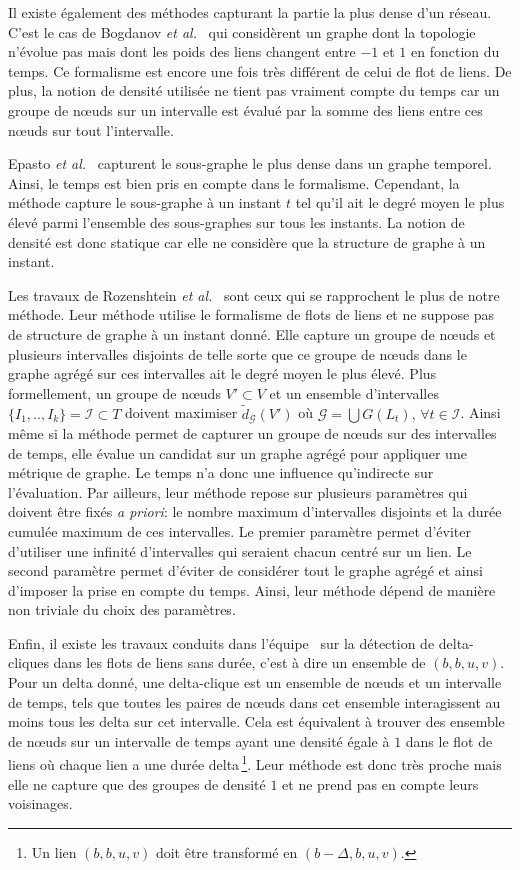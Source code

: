 Il existe également des méthodes capturant la partie la plus dense d'un réseau.
C'est le cas de Bogdanov \emph{et al.}~\cite{Bogdanov2011} qui considèrent  un graphe dont la topologie n'évolue pas mais dont les poids des liens changent entre $-1$ et $1$ en fonction du temps.
Ce formalisme est encore une fois très différent de celui de flot de liens.
De plus, la notion de densité utilisée ne tient pas vraiment compte du temps car un groupe de n\oe{}uds sur un intervalle est évalué par la somme des liens entre ces n\oe{}uds sur tout l'intervalle.


Epasto \emph{et al.}~\cite{Epasto2015} capturent le sous-graphe le plus dense dans un graphe temporel.
Ainsi, le temps est bien pris en compte dans le formalisme.
Cependant, la méthode capture le sous-graphe à un instant $t$ tel qu'il ait le degré moyen le plus élevé parmi l'ensemble des sous-graphes sur tous les instants.
La notion de densité est donc statique car elle ne considère que la structure de graphe à un instant.


Les travaux de Rozenshtein \emph{et al.}~\cite{rozenshtein2014} sont ceux qui se rapprochent le plus de notre méthode.
Leur méthode utilise le formalisme de flots de liens et ne suppose pas de structure de graphe à un instant donné.
Elle capture un groupe de n\oe{}uds et plusieurs intervalles disjoints de telle sorte que ce groupe de n\oe{}uds dans le graphe agrégé sur ces intervalles ait le degré moyen le plus élevé.
Plus formellement, un groupe de n\oe{}uds $V'\subset V$ et un ensemble d'intervalles $\{I_1,..,I_k\} = \mathcal{I} \subset T$ doivent maximiser $\tilde{d}_\mathcal{G}(V')$ où  $\mathcal{G}= \bigcup G(L_t),\,\forall t \in \mathcal{I}$.
Ainsi même si la méthode permet de capturer un groupe de n\oe{}uds sur des intervalles de temps, elle évalue un candidat sur un graphe agrégé pour appliquer une métrique de graphe.
Le temps n'a donc une influence qu'indirecte sur l'évaluation.
Par ailleurs, leur méthode repose sur plusieurs paramètres qui doivent être fixés \emph{a priori}: le nombre maximum d'intervalles disjoints et la durée cumulée maximum de ces intervalles.
Le premier paramètre permet d'éviter d'utiliser une infinité d'intervalles qui seraient chacun centré sur un lien.
Le second paramètre permet d'éviter de considérer tout le graphe agrégé et ainsi d'imposer la prise en compte du temps.
Ainsi, leur méthode dépend de manière non triviale du choix des paramètres.

Enfin, il existe les travaux conduits dans l'équipe~\cite{viard:hal-01208330,Viard2016} sur la détection de delta-cliques dans les flots de liens sans durée, c'est à dire un ensemble de $(b,b,u,v)$.
Pour un delta donné, une delta-clique est un ensemble de n\oe{}uds et un intervalle de temps, tels que toutes les paires de n\oe{}uds dans cet ensemble interagissent au moins tous les delta sur cet intervalle.
Cela est équivalent à trouver des ensemble de n\oe{}uds sur un intervalle de temps ayant une densité égale à $1$ dans le flot de liens où chaque lien a une durée delta\,\footnote{Un lien $(b,b,u,v)$ doit être transformé en $(b-\Delta,b,u,v)$.}.
Leur méthode est donc très proche mais elle ne capture que des groupes de densité $1$ et ne prend pas en compte leurs voisinages.


